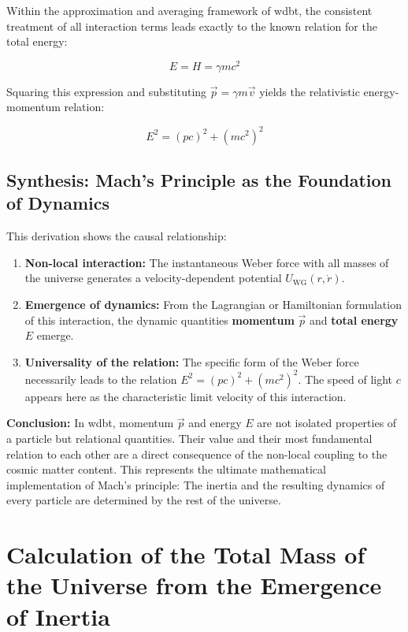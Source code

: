 Within the approximation and averaging framework of \gls{wdbt}, the consistent treatment of all interaction terms leads exactly to the known relation for the total energy:

\begin{equation}
    E = H = \gamma m c^2
\end{equation}

Squaring this expression and substituting $\vec{p} = \gamma m \vec{v}$ yields the relativistic energy-momentum relation:

\begin{equation}
    E^2 = (p c)^2 + (m c^2)^2
\end{equation}

\section{Synthesis: Mach's Principle as the Foundation of Dynamics}
This derivation shows the causal relationship:

\begin{enumerate}
    \item \textbf{Non-local interaction:} The instantaneous Weber force with all masses of the universe generates a velocity-dependent potential $U_\text{WG}(r, \dot{r})$.
    \item \textbf{Emergence of dynamics:} From the Lagrangian or Hamiltonian formulation of this interaction, the dynamic quantities \textbf{momentum} $\vec{p}$ and \textbf{total energy} $E$ emerge.
    \item \textbf{Universality of the relation:} The specific form of the Weber force necessarily leads to the relation $E^2 = (p c)^2 + (m c^2)^2$. The speed of light $c$ appears here as the characteristic limit velocity of this interaction.
\end{enumerate}

\textbf{Conclusion:} In \gls{wdbt}, momentum $\vec{p}$ and energy $E$ are not isolated properties of a particle but relational quantities. Their value and their most fundamental relation to each other are a direct consequence of the non-local coupling to the cosmic matter content. This represents the ultimate mathematical implementation of Mach's principle: The inertia and the resulting dynamics of every particle are determined by the rest of the universe.

\chapter{Calculation of the Total Mass of the Universe from the Emergence of Inertia}
